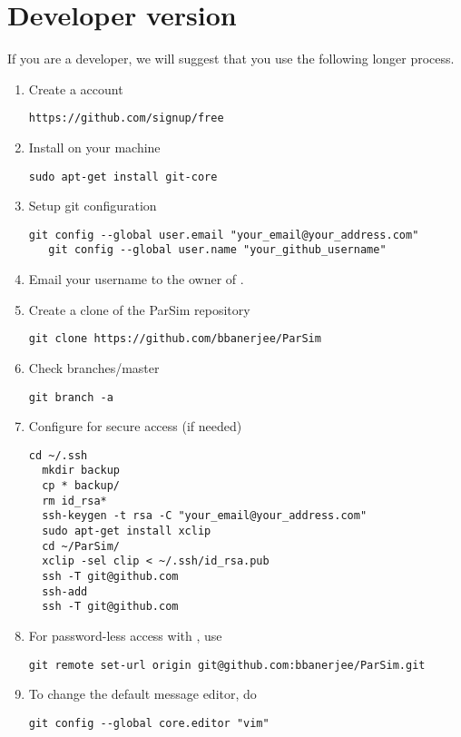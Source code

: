 \documentclass[11pt,fleqn]{book} %
\begin{document}
\section{Developer version}
If you are a developer, we will suggest that you use the following longer process.
\begin{enumerate}
  \item  Create a  account
\begin{lstlisting}[backgroundcolor=\color{background}]
   https://github.com/signup/free
\end{lstlisting}

  \item  Install  on your machine
\begin{lstlisting}[backgroundcolor=\color{background}]
   sudo apt-get install git-core
\end{lstlisting}

  \item  Setup git configuration
\begin{lstlisting}[backgroundcolor=\color{background}]
   git config --global user.email "your_email@your_address.com"
   git config --global user.name "your_github_username"
\end{lstlisting}

  \item Email your  username to the owner of \Parsim.

  \item Create a clone of the ParSim repository
\begin{lstlisting}[backgroundcolor=\color{background}]
   git clone https://github.com/bbanerjee/ParSim
\end{lstlisting}

  \item Check branches/master
\begin{lstlisting}[backgroundcolor=\color{background}]
  git branch -a
\end{lstlisting}

  \item Configure  for secure access (if needed)
\begin{lstlisting}[backgroundcolor=\color{background}]
  cd ~/.ssh
  mkdir backup
  cp * backup/
  rm id_rsa*
  ssh-keygen -t rsa -C "your_email@your_address.com"
  sudo apt-get install xclip
  cd ~/ParSim/
  xclip -sel clip < ~/.ssh/id_rsa.pub
  ssh -T git@github.com
  ssh-add
  ssh -T git@github.com
\end{lstlisting}

  \item For password-less access with , use
\begin{lstlisting}[backgroundcolor=\color{background}]
  git remote set-url origin git@github.com:bbanerjee/ParSim.git
\end{lstlisting}

  \item To change the default message editor, do
\begin{lstlisting}[backgroundcolor=\color{background}]
  git config --global core.editor "vim"
\end{lstlisting}
\end{enumerate}
\end{document}

